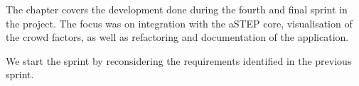 The chapter covers the development done during the fourth and final sprint in the project. The focus was on integration with the aSTEP core, visualisation of the crowd factors, as well as refactoring and documentation of the application.

We start the sprint by reconsidering the requirements identified in the previous sprint. 